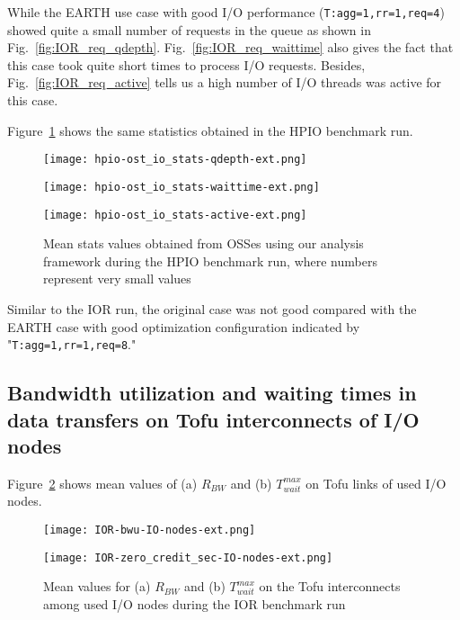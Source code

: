 \documentclass{jhps}
\begin{document}
While the EARTH use case with good I/O performance ({\tt T:agg=1,rr=1,req=4})
showed quite a small number of requests in the queue as shown in
Fig.~\ref{fig:IOR_req_qdepth}.
Fig.~\ref{fig:IOR_req_waittime} also gives
the fact that this case took quite short times to process I/O requests.
Besides, Fig.~\ref{fig:IOR_req_active}
tells us a high number of I/O threads was active for this case.

Figure~\ref{fig:HPIO_OST_IO_STATS} shows the same statistics obtained
in the HPIO benchmark run.
%
\begin{figure}[tb]
\centering
\begin{minipage}[t]{0.44\textwidth}
 \centering
 \texttt{[image: hpio-ost\_io\_stats-qdepth-ext.png]}
 \label{fig:HPIO_req_qdepth}
\end{minipage}
%
\noindent
\begin{minipage}[t]{0.44\textwidth}
 \centering
 \texttt{[image: hpio-ost\_io\_stats-waittime-ext.png]}
 \label{fig:HPIO_req_waittime}
\end{minipage}
%
\noindent
\begin{minipage}[t]{0.44\textwidth}
 \centering
 \texttt{[image: hpio-ost\_io\_stats-active-ext.png]}
 \label{fig:HPIO_req_active}
\end{minipage}
%
\caption{Mean stats values obtained from OSSes using our analysis framework
during the HPIO benchmark run, where numbers represent very small values}
\label{fig:HPIO_OST_IO_STATS}
\end{figure}
%
Similar to the IOR run, the original case was not good compared
with the EARTH case with good optimization configuration
indicated by "{\tt T:agg=1,rr=1,req=8}."

\subsection{Bandwidth utilization and waiting times in data transfers on Tofu interconnects of I/O nodes}

Figure~\ref{fig:IOR_ION_TOFU_BWU_WAIT_TIME} shows mean values of
(a) $R_{BW}$ and (b) $T_{wait}^{max}$ on Tofu links of used I/O nodes.
%
\begin{figure}[tb]
\centering
\begin{minipage}[t]{0.48\textwidth}
 \centering
 \texttt{[image: IOR-bwu-IO-nodes-ext.png]}
 \label{fig:IOR_ION_TOFU_BW_UTIL}
\end{minipage}
%
\noindent
\begin{minipage}[t]{0.48\textwidth}
 \centering
 \texttt{[image: IOR-zero\_credit\_sec-IO-nodes-ext.png]}
 \label{fig:IOR_ION_TOFU_WAIT_TIME}
\end{minipage}
\caption{
Mean values for (a) $R_{BW}$ and (b) $T_{wait}^{max}$ on the Tofu interconnects
among used I/O nodes during the IOR benchmark run}
\label{fig:IOR_ION_TOFU_BWU_WAIT_TIME}
\end{figure}
%
\end{document}
